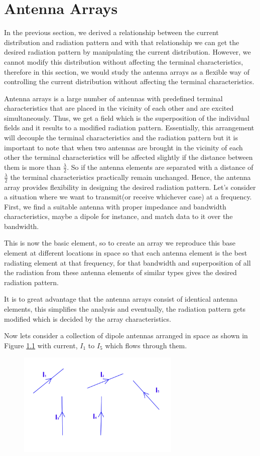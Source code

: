 \chapter{Antenna Arrays}
In the previous section, we derived a relationship between the current distribution and radiation pattern and with that relationship we can get the desired radiation pattern by manipulating the current distribution. However, we cannot modify this distribution without affecting the terminal characteristics, therefore in this section, we would study the antenna arrays as a flexible way of controlling the current distribution without affecting the terminal characteristics.

Antenna arrays is a large number of antennas with predefined terminal characteristics that are placed in the vicinity of each other and are excited simultaneously. Thus, we get a field which is the superposition of the individual fields and it results to a modified radiation pattern. Essentially, this arrangement will decouple the terminal characteristics and the radiation pattern but it is important to note that when two antennas are brought in the vicinity of each other the terminal characteristics will be affected slightly if the distance between them is more than $ \frac{\lambda}{2}$. So if the antenna elements are separated with a distance of $ \frac{\lambda}{2} $ the terminal characteristics practically remain unchanged. Hence, the antenna array provides flexibility in designing the desired radiation pattern. Let's consider a situation where we want to transmit(or receive whichever case) at a frequency. First, we find a suitable antenna with proper impedance and bandwidth characteristics, maybe a dipole for instance, and match data to it over the bandwidth.

This is now the basic element, so to create an array we reproduce this base element at different locations in space so that each antenna element is the best radiating element at that frequency, for that bandwidth and superposition of all the radiation from these antenna elements of similar types gives the desired radiation pattern.

It is to great advantage that the antenna arrays consist of identical antenna elements, this simplifies the analysis and eventually, the radiation pattern gets modified which is decided by the array characteristics.

Now lets consider a collection of dipole antennas arranged in space as shown in Figure \ref{52.1} with current, $I_1$ to $I_5$ which flows through them.
\begin{figure}[h]
\centering
\includegraphics[height=5cm]{./graphics/fig52_1}
\caption{}
\label{52.1}
\end{figure}


